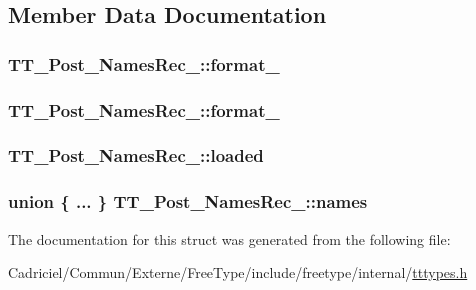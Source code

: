 \subsection{Member Data Documentation}
\hypertarget{struct_t_t___post___names_rec___a72f5c635f0b9aa4c7115ef959d82b481}{
\subsubsection[{format\-\_\-20}]{ T\-T\-\_\-\-Post\-\_\-\-Names\-Rec\-\_\-\-::format\-\_}}\label{struct_t_t___post___names_rec___a72f5c635f0b9aa4c7115ef959d82b481}
\hypertarget{struct_t_t___post___names_rec___ae8d289766a901d9af02d0a889d110186}{
\subsubsection[{format\-\_\-25}]{ T\-T\-\_\-\-Post\-\_\-\-Names\-Rec\-\_\-\-::format\-\_}}\label{struct_t_t___post___names_rec___ae8d289766a901d9af02d0a889d110186}
\hypertarget{struct_t_t___post___names_rec___a8878ac4555c3df60958869f0d53383c9}{
\subsubsection[{loaded}]{ T\-T\-\_\-\-Post\-\_\-\-Names\-Rec\-\_\-\-::loaded}}\label{struct_t_t___post___names_rec___a8878ac4555c3df60958869f0d53383c9}
\hypertarget{struct_t_t___post___names_rec___a833df0c14836e44c9f148a713443af8e}{
\subsubsection[{names}]{\setlength{\rightskip}{0pt plus 5cm}union \{ ... \}   T\-T\-\_\-\-Post\-\_\-\-Names\-Rec\-\_\-\-::names}}\label{struct_t_t___post___names_rec___a833df0c14836e44c9f148a713443af8e}


The documentation for this struct was generated from the following file\-:\begin{DoxyCompactItemize}
\item 
Cadriciel/\-Commun/\-Externe/\-Free\-Type/include/freetype/internal/\hyperlink{tttypes_8h}{tttypes.\-h}\end{DoxyCompactItemize}
